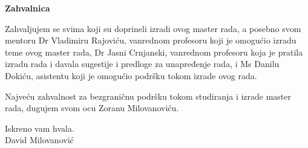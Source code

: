 \documentclass[a4paper, 12pt, diplomski]{etf}
\begin{document}
\newpage

\thispagestyle{empty}

\begin{center}
\vspace*{\fill}

	\begin{Large}
		\textbf{Zahvalnica}
	\end{Large}
	
	Zahvaljujem se svima koji su doprineli izradi ovog master rada, a posebno svom mentoru Dr Vladimiru Rajoviću, vanrednom profesoru koji je omogućio izradu teme ovog master rada, Dr Jasni Crnjanski, vanrednom profesoru koja je pratila izradu rada i davala sugestije i predloge za unapređenje rada, i Ms Danilu Đokiću, asistentu koji je omogućio podršku tokom izrade ovog rada.
	
	Najveću zahvalnost za bezgraničnu podršku tokom studiranja i izrade master rada, dugujem svom ocu Zoranu Milovanoviću.
	
	\hfill Iskreno vam hvala.\\
	\hfill David Milovanović
		
\vspace*{\fill}	
\end{center}


\newpage

\tableofcontents

\thispagestyle{empty}

\newpage



\end{document}
